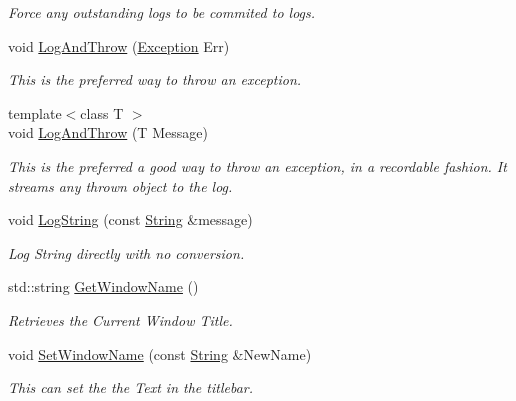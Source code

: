 \begin{DoxyCompactItemize}
\begin{DoxyCompactList}\small\item\em Force any outstanding logs to be commited to logs. \item\end{DoxyCompactList}\item 
void \hyperlink{classphys_1_1World_a372ee96d395d735531f755fc0a72de4a}{LogAndThrow} (\hyperlink{classphys_1_1Exception}{Exception} Err)
\begin{DoxyCompactList}\small\item\em This is the preferred way to throw an exception. \item\end{DoxyCompactList}\item 
{\footnotesize template$<$class T $>$ }\\void \hyperlink{classphys_1_1World_a88e6bdee6b972111b6804ca746738c50}{LogAndThrow} (T Message)
\begin{DoxyCompactList}\small\item\em This is the preferred a good way to throw an exception, in a recordable fashion. It streams any thrown object to the log. \item\end{DoxyCompactList}\item 
void \hyperlink{classphys_1_1World_abf6cb15d85be4e7dcb99db24f979319b}{LogString} (const \hyperlink{namespacephys_aa03900411993de7fbfec4789bc1d392e}{String} \&message)
\begin{DoxyCompactList}\small\item\em Log String directly with no conversion. \item\end{DoxyCompactList}\item 
std::string \hyperlink{classphys_1_1World_a1f0139bbc9561bcf18844be25e4adc73}{GetWindowName} ()
\begin{DoxyCompactList}\small\item\em Retrieves the Current Window Title. \item\end{DoxyCompactList}\item 
void \hyperlink{classphys_1_1World_acd0dff342c08fe3008226488b7c53d97}{SetWindowName} (const \hyperlink{namespacephys_aa03900411993de7fbfec4789bc1d392e}{String} \&NewName)
\begin{DoxyCompactList}\small\item\em This can set the the Text in the titlebar. \item\end{DoxyCompactList}\item 

\end{DoxyCompactItemize}
